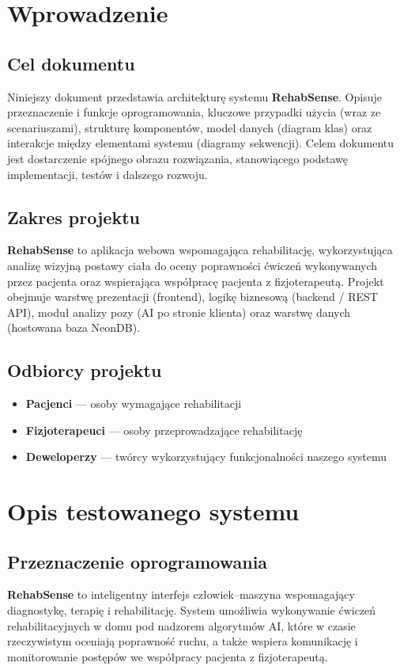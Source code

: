 \documentclass[11pt,a4paper]{article}
\newcommand{\sysname}{\textbf{RehabSense}}
\begin{document}
\section{Wprowadzenie}
\subsection{Cel dokumentu}
Niniejszy dokument przedstawia architekturę systemu \sysname{}. Opisuje przeznaczenie i funkcje oprogramowania, kluczowe przypadki użycia (wraz ze scenariuszami), strukturę komponentów, model danych (diagram klas) oraz interakcje między elementami systemu (diagramy sekwencji). Celem dokumentu jest dostarczenie spójnego obrazu rozwiązania, stanowiącego podstawę implementacji, testów i dalszego rozwoju.

\subsection{Zakres projektu}
\sysname{} to aplikacja webowa wspomagająca rehabilitację, wykorzystująca analizę wizyjną postawy ciała do oceny poprawności ćwiczeń wykonywanych przez pacjenta oraz wspierająca współpracę pacjenta z fizjoterapeutą. Projekt obejmuje warstwę prezentacji (frontend), logikę biznesową (backend / REST API), moduł analizy pozy (AI po stronie klienta) oraz warstwę danych (hostowana baza NeonDB).

\subsection{Odbiorcy projektu}
\begin{itemize}
  \item \textbf{Pacjenci} — osoby wymagające rehabilitacji
  \item \textbf{Fizjoterapeuci} — osoby przeprowadzające rehabilitację
  \item \textbf{Deweloperzy} — twórcy wykorzystujący funkcjonalności naszego systemu
\end{itemize}

\section{Opis testowanego systemu}
\subsection{Przeznaczenie oprogramowania}
\sysname{} to inteligentny interfejs człowiek–maszyna wspomagający diagnostykę, terapię i rehabilitację. System umożliwia wykonywanie ćwiczeń rehabilitacyjnych w domu pod nadzorem algorytmów AI, które w czasie rzeczywistym oceniają poprawność ruchu, a także wspiera komunikację i monitorowanie postępów we współpracy pacjenta z fizjoterapeutą.
\end{document}
